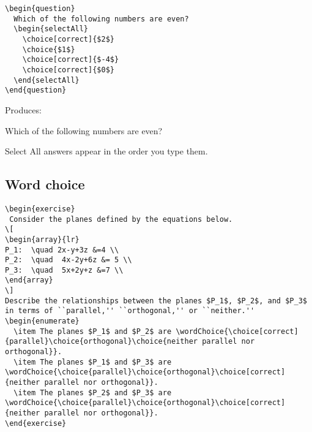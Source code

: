 \documentclass{ximera}
\begin{document}
\begin{verbatim}
\begin{question}
  Which of the following numbers are even?
  \begin{selectAll}
    \choice[correct]{$2$}
    \choice{$1$}
    \choice[correct]{$-4$}
    \choice[correct]{$0$}
  \end{selectAll}
\end{question}
\end{verbatim}

Produces:

\begin{question}
  Which of the following numbers are even?
  \begin{selectAll}
  \end{selectAll}
\end{question}

\begin{remark}
  Select All answers appear in the order you type them.
\end{remark}

\subsection{Word choice}
\begin{verbatim}
\begin{exercise}
 Consider the planes defined by the equations below.
\[
\begin{array}{lr}
P_1:  \quad 2x-y+3z &=4 \\
P_2:  \quad  4x-2y+6z &= 5 \\
P_3:  \quad  5x+2y+z &=7 \\
\end{array}
\]
Describe the relationships between the planes $P_1$, $P_2$, and $P_3$ in terms of ``parallel,'' ``orthogonal,'' or ``neither.''
\begin{enumerate}
  \item The planes $P_1$ and $P_2$ are \wordChoice{\choice[correct]{parallel}\choice{orthogonal}\choice{neither parallel nor orthogonal}}.
  \item The planes $P_1$ and $P_3$ are \wordChoice{\choice{parallel}\choice{orthogonal}\choice[correct]{neither parallel nor orthogonal}}.
  \item The planes $P_2$ and $P_3$ are \wordChoice{\choice{parallel}\choice{orthogonal}\choice[correct]{neither parallel nor orthogonal}}.
\end{exercise}
\end{verbatim}
\end{document}
